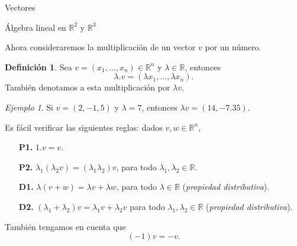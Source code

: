 \documentclass[a4paper,12pt,twoside,spanish,reqno]{amsbook}
\numberwithin{equation}{section}
\theoremstyle{definition}
\newtheorem{definicion}[teorema]{Definici\'on}
\theoremstyle{remark}
\newtheorem*{ejemplo*}{Ejemplo}
\newcommand{\R}{\mathbb R}
\begin{document}
\begin{chapter}{Vectores}
\begin{section}{Álgebra lineal en $\R^2$ y $\R^3$}
    

    Ahora consideraremos la multiplicación de un vector $v$ por un número. 
    
    \begin{definicion}
        Sea $v = (x_1,\ldots,x_n) \in \R^n$ y $\lambda \in \R$, entonces
        \begin{equation*}
            \lambda.v = (\lambda x_1,\ldots,\lambda x_n).
        \end{equation*}  
        También denotamos a esta multiplicación por $\lambda v$.
    \end{definicion}

    \begin{ejemplo*}
         Si $v= (2, -1,5)$  y $\lambda = 7$, entonces $\lambda v = (14, -7.35)$.
    \end{ejemplo*}
    
    Es fácil verificar las siguientes reglas: dados $v,w \in \R^n$, 
    \begin{enumerate}
        \item[\textbf{P1.}] $1.v=v$.
        \item[\textbf{P2.}] $\lambda_1(\lambda_2v) = (\lambda_1\lambda_2)v$, para todo $\lambda_1,\lambda_2 \in \R$.
        \item[\textbf{D1.}] $\lambda(v+w) = \lambda v +\lambda w$, para todo $\lambda \in \R$  (\textit{propiedad distributiva}).
        \item[\textbf{D2.}] $(\lambda_1+\lambda_2)v = \lambda_1v + \lambda_2 v$ para todo $\lambda_1,\lambda_2 \in \R$  (\textit{propiedad distributiva}).
    \end{enumerate}

    También tengamos en cuenta que 
    \begin{equation*}
        (-1)v = -v.
    \end{equation*}
    

\end{section}
\end{chapter}
\end{document}
